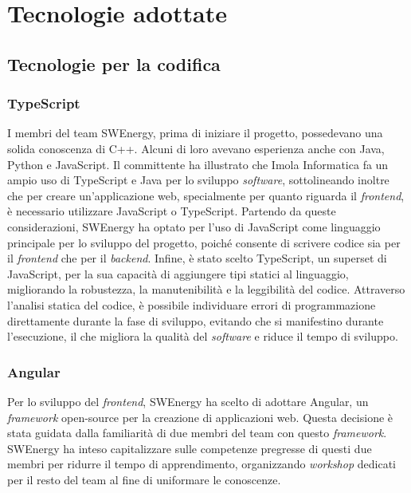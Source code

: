 \section{Tecnologie adottate}

\subsection{Tecnologie per la codifica}

\subsubsection{TypeScript}

I membri del team SWEnergy, prima di iniziare il progetto, possedevano una
solida conoscenza di C++. Alcuni di loro avevano esperienza anche con Java,
Python e JavaScript. Il committente ha illustrato che Imola Informatica fa un
ampio uso di TypeScript e Java per lo sviluppo \textit{software}, sottolineando
inoltre che per creare un'applicazione web, specialmente per quanto riguarda il
\textit{frontend}, è necessario utilizzare JavaScript o TypeScript. Partendo da
queste considerazioni, SWEnergy ha optato per l'uso di JavaScript come
linguaggio principale per lo sviluppo del progetto, poiché consente di scrivere
codice sia per il \textit{frontend} che per il \textit{backend}. Infine, è stato
scelto TypeScript, un superset di JavaScript, per la sua capacità di aggiungere
tipi statici al linguaggio, migliorando la robustezza, la manutenibilità e la
leggibilità del codice. Attraverso l'analisi statica del codice, è possibile
individuare errori di programmazione direttamente durante la fase di sviluppo,
evitando che si manifestino durante l'esecuzione, il che migliora la qualità del
\textit{software} e riduce il tempo di sviluppo.

\subsubsection{Angular}

Per lo sviluppo del \textit{frontend}, SWEnergy ha scelto di adottare Angular,
un \textit{framework} open-source per la creazione di applicazioni web. Questa
decisione è stata guidata dalla familiarità di due membri del team con questo
\textit{framework}. SWEnergy ha inteso capitalizzare sulle competenze pregresse
di questi due membri per ridurre il tempo di apprendimento, organizzando
\textit{workshop} dedicati per il resto del team al fine di uniformare le
conoscenze.


